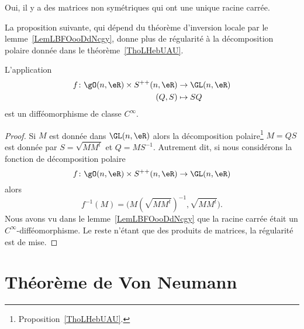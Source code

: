 \begin{remark}
    Oui, il y a des matrices non symétriques qui ont une unique racine carrée.
\end{remark}

La proposition suivante, qui dépend du théorème d'inversion locale par le lemme~\ref{LemLBFOooDdNcgy}, donne plus de régularité à la décomposition polaire donnée dans le théorème~\ref{ThoLHebUAU}.
\begin{proposition}       \label{PropWCXAooDuFMjn}
    L'application
    \begin{equation}
        \begin{aligned}
            f\colon \gO(n,\eR)\times S^{++}(n,\eR)  & \to \GL(n,\eR)  \\
                              (Q,S)                 & \mapsto SQ
        \end{aligned}
    \end{equation}
    est un difféomorphisme de classe \( C^{\infty}\).
\end{proposition}

\begin{proof}
    Si \( M\) est donnée dans \( \GL(n,\eR)\) alors la décomposition polaire\footnote{Proposition~\ref{ThoLHebUAU}.} \( M=QS\) est donnée par \( S=\sqrt{MM^t}\) et \( Q=MS^{-1}\). Autrement dit, si nous considérons la fonction de décomposition polaire
    \begin{equation}
        f\colon \gO(n,\eR)\times S^{++}(n,\eR)\to \GL(n,\eR)
    \end{equation}
    alors
    \begin{equation}
        f^{-1}(M)=\big(  M(\sqrt{MM^t})^{-1},\sqrt{MM^t}  \big).
    \end{equation}
    Nous avons vu dans le lemme~\ref{LemLBFOooDdNcgy} que la racine carrée était un \( C^{\infty}\)-difféomorphisme. Le reste n'étant que des produits de matrices, la régularité est de mise.
\end{proof}

\section{Théorème de Von Neumann}


